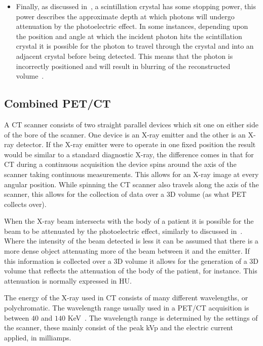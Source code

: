 \begin{itemize}
                    \item Finally, as discussed in~, a scintillation crystal has some stopping power, this power describes the approximate depth at which photons will undergo attenuation by the photoelectric effect. In some instances, depending upon the position and angle at which the incident photon hits the scintillation crystal it is possible for the photon to travel through the crystal and into an adjacent crystal before being detected. This means that the photon is incorrectly positioned and will result in blurring of the reconstructed volume~.
                \end{itemize}
        
        \subsection{Combined PET/CT} \label{sec:combined_pet_ct}
            A \gls{CT} scanner consists of two straight parallel devices which sit one on either side of the bore of the scanner. One device is an X-ray emitter and the other is an X-ray detector. If the X-ray emitter were to operate in one fixed position the result would be similar to a standard diagnostic X-ray, the difference comes in that for \gls{CT} during a continuous acquisition the device spins around the axis of the scanner taking continuous measurements. This allows for an X-ray image at every angular position. While spinning the \gls{CT} scanner also travels along the axis of the scanner, this allows for the collection of data over a \gls{3D} volume (as what \gls{PET} collects over).
            
            When the X-ray beam intersects with the body of a patient it is possible for the beam to be attenuated by the photoelectric effect, similarly to discussed in~. Where the intensity of the beam detected is less it can be assumed that there is a more dense object attenuating more of the beam between it and the emitter. If this information is collected over a \gls{3D} volume it allows for the generation of a \gls{3D} volume that reflects the attenuation of the body of the patient, for instance. This attenuation is normally expressed in \gls{HU}.
            
            The energy of the X-ray used in \gls{CT} consists of many different wavelengths, or polychromatic. The wavelength range usually used in a \gls{PET}/\gls{CT} acquisition is between $40$ and $140$ \gls{KeV}~. The wavelength range is determined by the settings of the scanner, these mainly consist of the peak \gls{kVp} and the electric current applied, in milliamps.
            
